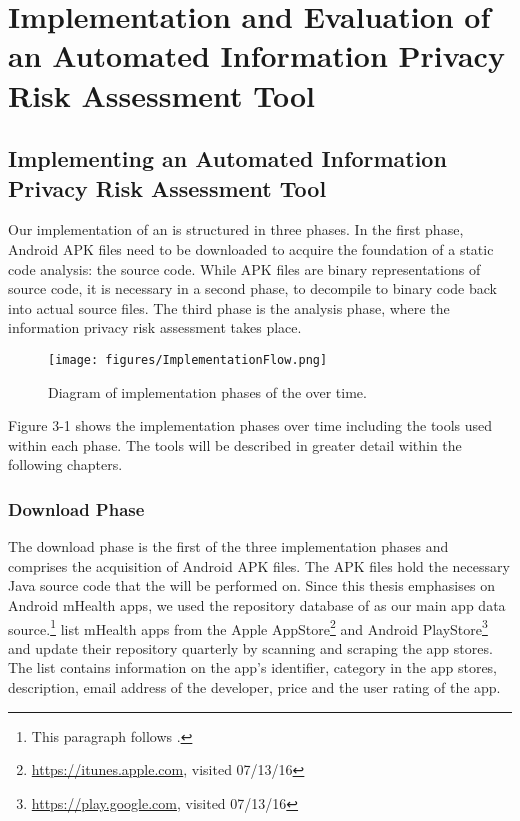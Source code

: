 \section{Implementation and Evaluation of an Automated Information Privacy Risk Assessment Tool}

\subsection{Implementing an Automated Information Privacy Risk Assessment Tool}

Our implementation of an \aiprat is structured in three phases.
In the first phase, Android APK files need to be downloaded to acquire the foundation of a static code analysis: the source code.
While APK files are binary representations of source code, it is necessary in a second phase, to decompile to binary code back into actual source files.
The third phase is the analysis phase, where the information privacy risk assessment takes place.

\begin{figure}[h]
	\label{fig:implementationPhases}
	\centering
	\texttt{[image: figures/ImplementationFlow.png]}
	\caption{Diagram of implementation phases of the \aiprat over time.}
\end{figure}

Figure 3-1 shows the implementation phases over time including the tools used within each phase. 
The tools will be described in greater detail within the following chapters.

\subsubsection{Download Phase}

The download phase is the first of the three implementation phases and comprises the acquisition of Android APK files. 
The APK files hold the necessary Java source code that the \sca will be performed on.
Since this thesis emphasises on Android mHealth apps, we used the repository database of \cite{Xu2015} as our main app data source.\footnote{This paragraph follows \cite{Xu2015}.}
\cite{Xu2015} list mHealth apps from the Apple AppStore\footnote{\url{https://itunes.apple.com}, visited 07/13/16} and Android PlayStore\footnote{\url{https://play.google.com}, visited 07/13/16} and update their repository quarterly by scanning and scraping the app stores.
The list contains information on the app's identifier, category in the app stores, description, email address of the developer, price and the user rating of the app.

